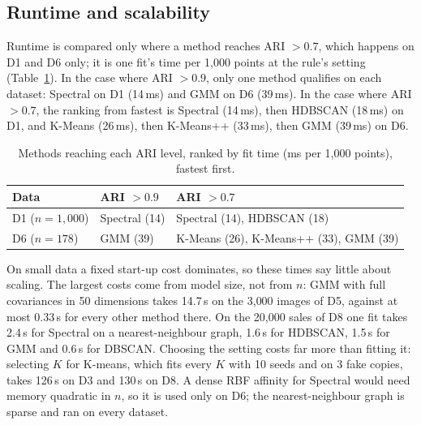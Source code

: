 \subsection{Runtime and scalability}\label{sec:runtime}

Runtime is compared only where a method reaches ARI $>0.7$, which happens on D1 and D6 only; it is one
fit's time per 1{,}000 points at the rule's setting (Table~\ref{tab:runtime}).
In the case where ARI $>0.9$, only one method qualifies on each dataset: Spectral on D1 (14\,ms) and GMM
on D6 (39\,ms). In the case where ARI $>0.7$, the ranking from fastest is Spectral (14\,ms), then HDBSCAN
(18\,ms) on D1, and K-Means (26\,ms), then K-Means++ (33\,ms), then GMM (39\,ms) on D6.

\begin{table}[h]\centering\small
\caption{Methods reaching each ARI level, ranked by fit time (ms per 1{,}000 points), fastest first.}
\label{tab:runtime}
\begin{tabular}{lll}
\toprule
\textbf{Data} & \textbf{ARI $>0.9$} & \textbf{ARI $>0.7$} \\
\midrule
D1 ($n=1{,}000$) & Spectral (14) & Spectral (14), HDBSCAN (18) \\
D6 ($n=178$)     & GMM (39)       & K-Means (26), K-Means++ (33), GMM (39) \\
\bottomrule
\end{tabular}
\end{table}

On small data a fixed start-up cost dominates, so these times say little about scaling. The largest
costs come from model size, not from $n$: GMM with full covariances in 50 dimensions takes 14.7\,s on the
3{,}000 images of D5, against at most 0.33\,s for every other method there. On the 20{,}000 sales of D8
one fit takes 2.4\,s for Spectral on a nearest-neighbour graph, 1.6\,s for HDBSCAN, 1.5\,s for GMM and
0.6\,s for DBSCAN. Choosing the setting costs far more than fitting it: selecting $K$ for K-means, which
fits every $K$ with 10 seeds and on 3 fake copies, takes 126\,s on D3 and 130\,s on D8. A dense RBF
affinity for Spectral would need memory quadratic in $n$, so it is used only on D6; the
nearest-neighbour graph is sparse and ran on every dataset.
